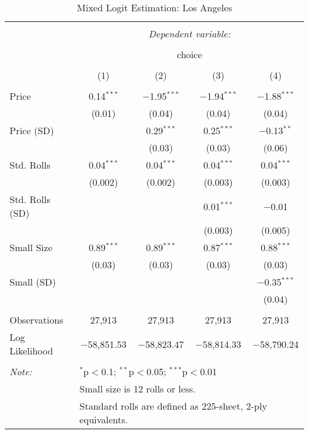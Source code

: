 
\begin{table}[!htbp] \centering 
  \caption{Mixed Logit Estimation: Los Angeles} 
  \label{tab:mnlLos AngelesRandCoefNoObsHet} 
\begin{tabular}{@{\extracolsep{5pt}}lcccc} 
\\[-1.8ex]\hline 
\hline \\[-1.8ex] 
 & \multicolumn{4}{c}{\textit{Dependent variable:}} \\ 
\cline{2-5} 
\\[-1.8ex] & \multicolumn{4}{c}{choice} \\ 
\\[-1.8ex] & (1) & (2) & (3) & (4)\\ 
\hline \\[-1.8ex] 
 Price & 0.14$^{***}$ & $-$1.95$^{***}$ & $-$1.94$^{***}$ & $-$1.88$^{***}$ \\ 
  & (0.01) & (0.04) & (0.04) & (0.04) \\ 
  Price (SD) &  & 0.29$^{***}$ & 0.25$^{***}$ & $-$0.13$^{**}$ \\ 
  &  & (0.03) & (0.03) & (0.06) \\ 
  Std. Rolls & 0.04$^{***}$ & 0.04$^{***}$ & 0.04$^{***}$ & 0.04$^{***}$ \\ 
  & (0.002) & (0.002) & (0.003) & (0.003) \\ 
  Std. Rolls (SD) &  &  & 0.01$^{***}$ & $-$0.01 \\ 
  &  &  & (0.003) & (0.005) \\ 
  Small Size & 0.89$^{***}$ & 0.89$^{***}$ & 0.87$^{***}$ & 0.88$^{***}$ \\ 
  & (0.03) & (0.03) & (0.03) & (0.03) \\ 
  Small (SD) &  &  &  & $-$0.35$^{***}$ \\ 
  &  &  &  & (0.04) \\ 
 \hline \\[-1.8ex] 
Observations & 27,913 & 27,913 & 27,913 & 27,913 \\ 
Log Likelihood & $-$58,851.53 & $-$58,823.47 & $-$58,814.33 & $-$58,790.24 \\ 
\hline 
\hline \\[-1.8ex] 
\textit{Note:}  & \multicolumn{4}{l}{$^{*}$p$<$0.1; $^{**}$p$<$0.05; $^{***}$p$<$0.01} \\ 
 & \multicolumn{4}{l}{Small size is 12 rolls or less.} \\ 
 & \multicolumn{4}{l}{Standard rolls are defined as 225-sheet, 2-ply equivalents.} \\ 
\end{tabular} 
\end{table} 
